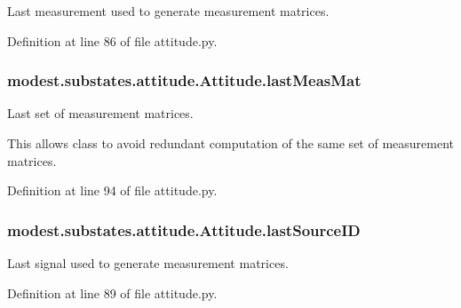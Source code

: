Last measurement used to generate measurement matrices. 



Definition at line 86 of file attitude.\+py.

\subsubsection[{\texorpdfstring{last\+Meas\+Mat}{lastMeasMat}}]{\setlength{\rightskip}{0pt plus 5cm}modest.\+substates.\+attitude.\+Attitude.\+last\+Meas\+Mat}\hypertarget{classmodest_1_1substates_1_1attitude_1_1Attitude_add344f4323848f4ccdd9e59d699310a0}{}\label{classmodest_1_1substates_1_1attitude_1_1Attitude_add344f4323848f4ccdd9e59d699310a0}


Last set of measurement matrices. 

This allows class to avoid redundant computation of the same set of measurement matrices. 

Definition at line 94 of file attitude.\+py.

\subsubsection[{\texorpdfstring{last\+Source\+ID}{lastSourceID}}]{\setlength{\rightskip}{0pt plus 5cm}modest.\+substates.\+attitude.\+Attitude.\+last\+Source\+ID}\hypertarget{classmodest_1_1substates_1_1attitude_1_1Attitude_a0ec5bf8475ca5c175e4a516d2ac68fdf}{}\label{classmodest_1_1substates_1_1attitude_1_1Attitude_a0ec5bf8475ca5c175e4a516d2ac68fdf}


Last signal used to generate measurement matrices. 



Definition at line 89 of file attitude.\+py.

